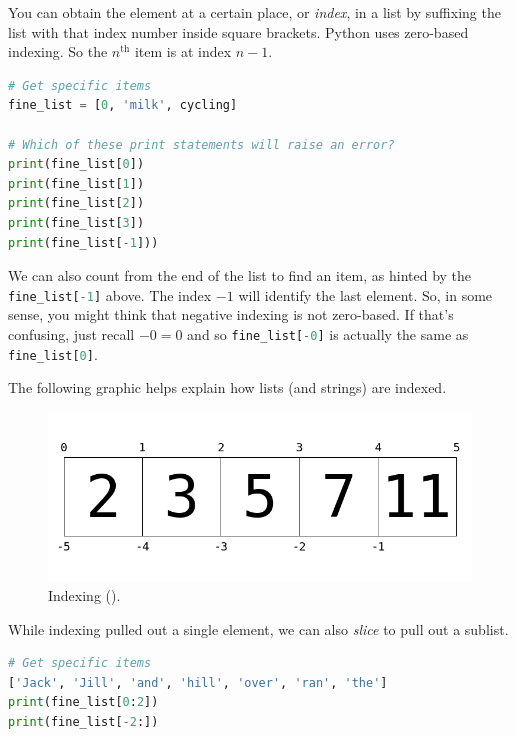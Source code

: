 You can obtain the element at a certain place, or \emph{index}, in a list by suffixing the list with that index number inside square brackets. 
Python uses zero-based indexing. So the $n^{\text{th}}$ item is at index $n-1$.


\begin{lstlisting}[language = Python]
# Get specific items
fine_list = [0, 'milk', cycling]

# Which of these print statements will raise an error?
print(fine_list[0])
print(fine_list[1])
print(fine_list[2])
print(fine_list[3])
print(fine_list[-1])) \end{lstlisting}



\smallskip
\noindent We can also count from the end of the list to find an item, as hinted by the 
\lstinline[language=Python]{fine_list[-1]} above. The index $-1$ will identify the last element. So, in some sense, you might think that negative indexing
is not zero-based. If that's confusing, just recall $-0 = 0$ and so \lstinline[language=Python]{fine_list[-0]} 
is actually the same as \lstinline[language=Python]{fine_list[0]}.


\smallskip

\noindent The following graphic helps explain how lists (and strings) are indexed.

\begin{figure}[h!] 
\begin{center} 
\includegraphics[width = .55\textwidth]{list_indexing.png}
\caption{Indexing ().}
\label{fig:while}
\end{center}
\end{figure}



\bigskip

\noindent While indexing pulled out a single element, we can also \emph{slice} to pull out a sublist. 


\begin{lstlisting}[language = Python]
# Get specific items
['Jack', 'Jill', 'and', 'hill', 'over', 'ran', 'the']
print(fine_list[0:2])
print(fine_list[-2:]) \end{lstlisting}

